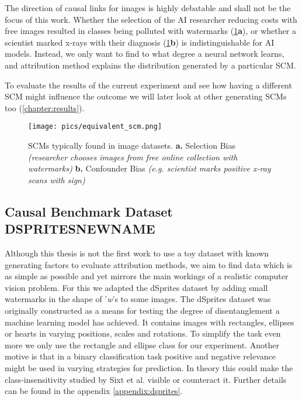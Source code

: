 The direction of causal links for images is highly debatable and shall not be the focus of this work. Whether the selection of the AI researcher reducing costs with free images resulted in classes being polluted with watermarks (\cref{fig:equivalent_scm}\textbf{a}), or whether a scientist marked x-rays with their diagnosis (\cref{fig:equivalent_scm}\textbf{b}) is indistinguishable for AI models. 
Instead, we only want to find to what degree a neural network learns, and attribution method explains the distribution generated by a particular SCM.

To evaluate the results of the current experiment and see how having a different SCM might influence the outcome we will later look at other generating SCMs too (\cref{chapter:results}).

\begin{figure}[H]
    \centering
    \texttt{[image: pics/equivalent\_scm.png]}
    \caption{SCMs typically found in image datasets.
    \textbf{a.} Selection Bias \textit{(researcher chooses images from free online collection with watermarks)}
    \textbf{b.} Confounder Bias \textit{(e.g. scientist marks positive x-ray scans with sign)}}
    \label{fig:equivalent_scm}
\end{figure}


\subsection{Causal Benchmark Dataset DSPRITESNEWNAME}\label{section:causal_model}
Although this thesis is not the first work to use a toy dataset with known generating factors to evaluate attribution methods, we aim to find data which is as simple as possible and yet mirrors the main workings of a realistic computer vision problem.  For this we adapted the dSprites dataset \cite{dsprites17} by adding small watermarks in the shape of '\textit{w}'s to some images. The dSprites dataset was originally constructed as a means for testing the degree of disentanglement a machine learning model has achieved. It contains images with rectangles, ellipses or hearts in varying positions, scales and rotations. To simplify the task even more we only use the rectangle and ellipse class for our experiment. Another motive is that in a binary classification task positive and negative relevance might be used in varying strategies for prediction. In theory this could make the class-insensitivity studied by Sixt et al. \cite{Sixt2020} visible or counteract it. Further details can be found in the appendix \cref{appendix:dsprites}.


